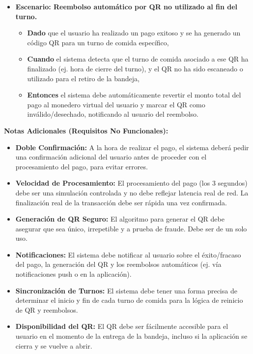 \documentclass[12pt]{article}
\begin{document}
\begin{itemize}
    \item \textbf{Escenario: Reembolso automático por QR no utilizado al fin del turno.}
    \begin{itemize}
        \item \textbf{Dado} que el usuario ha realizado un pago exitoso y se ha generado un código QR para un turno de comida específico,
        \item \textbf{Cuando} el sistema detecta que el turno de comida asociado a ese QR ha finalizado (ej. hora de cierre del turno), y el QR no ha sido escaneado o utilizado para el retiro de la bandeja,
        \item \textbf{Entonces} el sistema debe automáticamente revertir el monto total del pago al monedero virtual del usuario y marcar el QR como inválido/desechado, notificando al usuario del reembolso.
    \end{itemize}
\end{itemize}

\textbf{Notas Adicionales (Requisitos No Funcionales):}
\begin{itemize}
    \item \textbf{Doble Confirmación:} A la hora de realizar el pago, el sistema deberá pedir una confirmación adicional del usuario antes de proceder con el procesamiento del pago, para evitar errores.
    \item \textbf{Velocidad de Procesamiento:} El procesamiento del pago (los 3 segundos) debe ser una simulación controlada y no debe reflejar latencia real de red. La finalización real de la transacción debe ser rápida una vez confirmada.
    \item \textbf{Generación de QR Seguro:} El algoritmo para generar el QR debe asegurar que sea único, irrepetible y a prueba de fraude. Debe ser de un solo uso.
	\item \textbf{Notificaciones:} El sistema debe notificar al usuario sobre el éxito/fracaso del pago, la generación del QR y los reembolsos automáticos (ej. vía notificaciones push o en la aplicación).
    \item \textbf{Sincronización de Turnos:} El sistema debe tener una forma precisa de determinar el inicio y fin de cada turno de comida para la lógica de reinicio de QR y reembolsos.
    \item \textbf{Disponibilidad del QR:} El QR debe ser fácilmente accesible para el usuario en el momento de la entrega de la bandeja, incluso si la aplicación se cierra y se vuelve a abrir.
\end{itemize}
\end{document}
